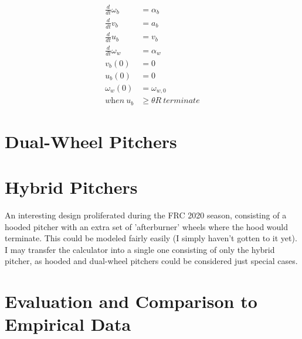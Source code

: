 \documentclass[10pt,letterpaper]{article}
\begin{document}
	\begin{align}
		\frac{d}{dt} \omega_b &= \alpha_b \\
		\frac{d}{dt} v_b &= a_b \\
		\frac{d}{dt} u_b &= v_b \\
		\frac{d}{dt} \omega_w &= \alpha_w \\
		v_b(0) &= 0 \\
		u_b(0) &= 0 \\
		\omega_w(0) &= \omega_{w,0} \\
		\textit{when} \ u_b &\geq \theta R \ \textit{terminate}
	\end{align}

\section*{Dual-Wheel Pitchers}

\section*{Hybrid Pitchers}
An interesting design proliferated during the FRC 2020 season, consisting of a hooded pitcher with an extra set of 'afterburner' wheels where the hood would terminate. This could be modeled fairly easily (I simply haven't gotten to it yet). I may transfer the calculator into a single one consisting of only the hybrid pitcher, as hooded and dual-wheel pitchers could be considered just special cases.

\section*{Evaluation and Comparison to Empirical Data}
\end{document}
